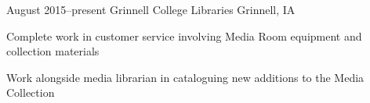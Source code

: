 \documentclass{article}
\begin{document}

\begin{cventries}

    {August 2015--present}
    {Grinnell College Libraries}
    {Grinnell, IA}
    {
      \item Complete work in customer service involving Media Room
        equipment and collection materials
      \item Work alongside media librarian in cataloguing new additions
        to the Media Collection
    }

\end{cventries}
\end{document}
